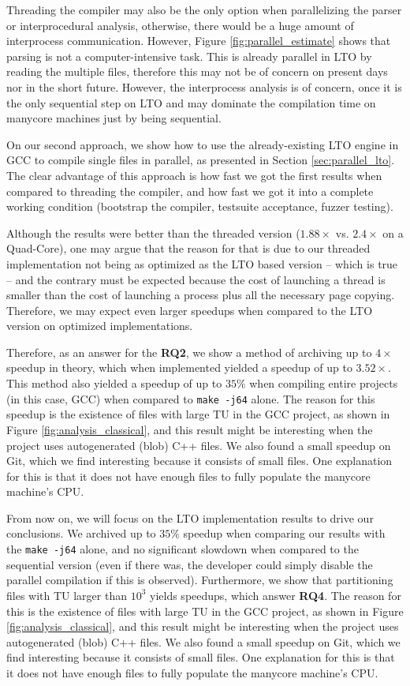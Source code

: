Threading the compiler may also be the only option when parallelizing the
parser or interprocedural analysis, otherwise, there would be a huge amount of
interprocess communication. However, Figure \ref{fig:parallel_estimate} shows
that parsing is not a computer-intensive task. This is already parallel in LTO
by reading the multiple files, therefore this may not be of concern on present
days nor in the short future. However, the interprocess analysis is of concern,
once it is the only sequential step on LTO and may dominate the compilation
time on manycore machines just by being sequential.

On our second approach, we show how to use the already-existing LTO engine in
GCC to compile single files in parallel, as presented in Section
\ref{sec:parallel_lto}. The clear advantage of this approach is how fast we got
the first results when compared to threading the compiler, and how fast we got
it into a complete working condition (bootstrap the compiler, testsuite
acceptance, fuzzer testing).

Although the results were better than the threaded version ($1.88\times$ vs. $2.4\times$
on a Quad-Core),
one may argue that the reason for that is due to our threaded implementation
not being as optimized as the LTO based version -- which is true -- and the
contrary must be expected because the cost of launching a thread is smaller
than the cost of launching a process plus all the necessary page copying.
Therefore, we may expect even larger speedups when compared to the LTO version
on optimized implementations.

Therefore, as an answer for the \textbf{RQ2}, we show a method of archiving up
to $4\times$ speedup in theory, which when implemented yielded a speedup of up
to $3.52\times$. This method also yielded a speedup of up to $35\%$ when
compiling entire projects (in this case, GCC) when compared to \texttt{make
-j64} alone. The reason for this speedup is the existence of files with large
TU in the GCC project, as shown in Figure \ref{fig:analysis_classical}, and
this result might be interesting when the project uses autogenerated (blob) C++
files. We also found a small speedup on Git, which we find interesting because
it consists of small files. One explanation for this is that it does not have
enough files to fully populate the manycore machine's CPU.

From now on, we will focus on the LTO implementation results to drive our
conclusions. We archived up to $35\%$ speedup when comparing our results with
the \texttt{make -j64} alone, and no significant slowdown when compared to the
sequential version (even if there was, the developer could simply disable the
parallel compilation if this is observed). Furthermore, we show that
partitioning files with TU larger than $10^3$ yields speedups, which answer
\textbf{RQ4}. The reason for this is the existence of files with large TU in
the GCC project, as shown in Figure \ref{fig:analysis_classical}, and this
result might be interesting when the project uses autogenerated (blob) C++
files. We also found a small speedup on Git, which we find interesting because
it consists of small files. One explanation for this is that it does not have
enough files to fully populate the manycore machine's CPU.

